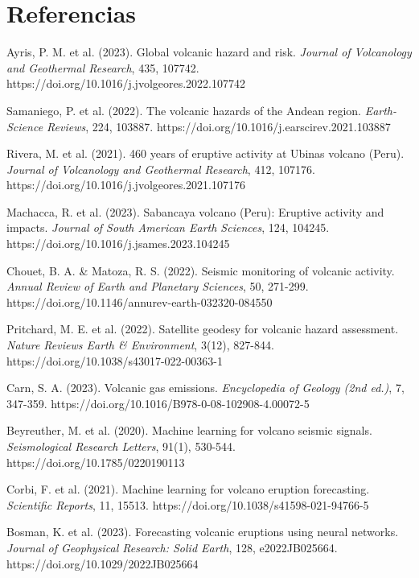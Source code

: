 \documentclass[11pt,a4paper]{article}
\begin{document}
\section{Referencias}
\begin{thebibliography}{99}

Ayris, P. M. et al. (2023). Global volcanic hazard and risk. \textit{Journal of Volcanology and Geothermal Research}, 435, 107742. https://doi.org/10.1016/j.jvolgeores.2022.107742

Samaniego, P. et al. (2022). The volcanic hazards of the Andean region. \textit{Earth-Science Reviews}, 224, 103887. https://doi.org/10.1016/j.earscirev.2021.103887

Rivera, M. et al. (2021). 460 years of eruptive activity at Ubinas volcano (Peru). \textit{Journal of Volcanology and Geothermal Research}, 412, 107176. https://doi.org/10.1016/j.jvolgeores.2021.107176

Machacca, R. et al. (2023). Sabancaya volcano (Peru): Eruptive activity and impacts. \textit{Journal of South American Earth Sciences}, 124, 104245. https://doi.org/10.1016/j.jsames.2023.104245

Chouet, B. A. \& Matoza, R. S. (2022). Seismic monitoring of volcanic activity. \textit{Annual Review of Earth and Planetary Sciences}, 50, 271-299. https://doi.org/10.1146/annurev-earth-032320-084550

Pritchard, M. E. et al. (2022). Satellite geodesy for volcanic hazard assessment. \textit{Nature Reviews Earth \& Environment}, 3(12), 827-844. https://doi.org/10.1038/s43017-022-00363-1

Carn, S. A. (2023). Volcanic gas emissions. \textit{Encyclopedia of Geology (2nd ed.)}, 7, 347-359. https://doi.org/10.1016/B978-0-08-102908-4.00072-5

Beyreuther, M. et al. (2020). Machine learning for volcano seismic signals. \textit{Seismological Research Letters}, 91(1), 530-544. https://doi.org/10.1785/0220190113

Corbi, F. et al. (2021). Machine learning for volcano eruption forecasting. \textit{Scientific Reports}, 11, 15513. https://doi.org/10.1038/s41598-021-94766-5

Bosman, K. et al. (2023). Forecasting volcanic eruptions using neural networks. \textit{Journal of Geophysical Research: Solid Earth}, 128, e2022JB025664. https://doi.org/10.1029/2022JB025664



\end{thebibliography}
\end{document}
